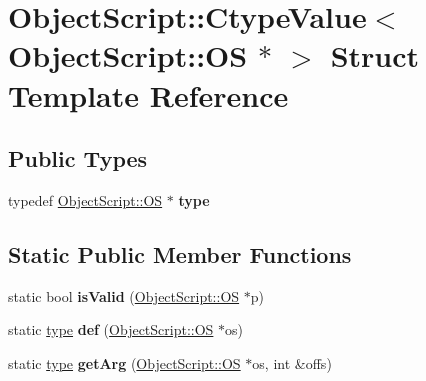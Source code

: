 \hypertarget{struct_object_script_1_1_ctype_value_3_01_object_script_1_1_o_s_01_5_01_4}{}\section{Object\+Script\+:\+:Ctype\+Value$<$ Object\+Script\+:\+:OS $\ast$ $>$ Struct Template Reference}
\label{struct_object_script_1_1_ctype_value_3_01_object_script_1_1_o_s_01_5_01_4}
\subsection*{Public Types}
\begin{DoxyCompactItemize}
\item 
typedef \hyperlink{class_object_script_1_1_o_s}{Object\+Script\+::\+OS} $\ast$ {\bfseries type}\hypertarget{struct_object_script_1_1_ctype_value_3_01_object_script_1_1_o_s_01_5_01_4_a7b29e5919c4898de05816a7c941f9ed9}{}\label{struct_object_script_1_1_ctype_value_3_01_object_script_1_1_o_s_01_5_01_4_a7b29e5919c4898de05816a7c941f9ed9}

\end{DoxyCompactItemize}
\subsection*{Static Public Member Functions}
\begin{DoxyCompactItemize}
\item 
static bool {\bfseries is\+Valid} (\hyperlink{class_object_script_1_1_o_s}{Object\+Script\+::\+OS} $\ast$p)\hypertarget{struct_object_script_1_1_ctype_value_3_01_object_script_1_1_o_s_01_5_01_4_ac2b71e53cb988bc1c139f2498f155e71}{}\label{struct_object_script_1_1_ctype_value_3_01_object_script_1_1_o_s_01_5_01_4_ac2b71e53cb988bc1c139f2498f155e71}

\item 
static \hyperlink{class_object_script_1_1_o_s}{type} {\bfseries def} (\hyperlink{class_object_script_1_1_o_s}{Object\+Script\+::\+OS} $\ast$os)\hypertarget{struct_object_script_1_1_ctype_value_3_01_object_script_1_1_o_s_01_5_01_4_a1e3227bfc4ea071edfca1b9ce594b7db}{}\label{struct_object_script_1_1_ctype_value_3_01_object_script_1_1_o_s_01_5_01_4_a1e3227bfc4ea071edfca1b9ce594b7db}

\item 
static \hyperlink{class_object_script_1_1_o_s}{type} {\bfseries get\+Arg} (\hyperlink{class_object_script_1_1_o_s}{Object\+Script\+::\+OS} $\ast$os, int \&offs)\hypertarget{struct_object_script_1_1_ctype_value_3_01_object_script_1_1_o_s_01_5_01_4_ac1c67a0530aebda027072d7d45b9d318}{}\label{struct_object_script_1_1_ctype_value_3_01_object_script_1_1_o_s_01_5_01_4_ac1c67a0530aebda027072d7d45b9d318}

\end{DoxyCompactItemize}


